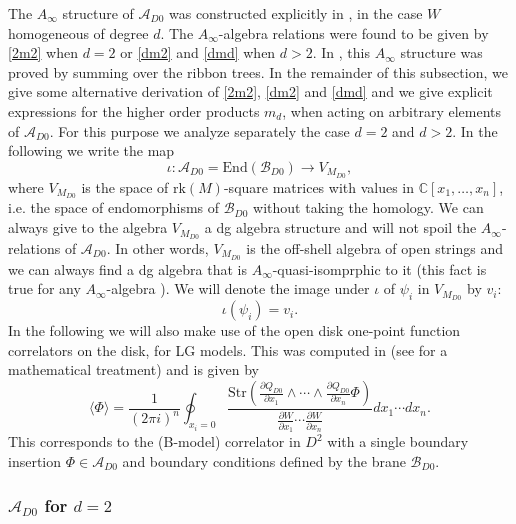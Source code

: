 \documentclass[a4paper,11pt]{article}
\newcommand{\Af}{{A_\infty}}
\numberwithin{equation}{section}
\begin{document}
The $\Af$ structure of $\mathcal{A}_{D0}$ was constructed explicitly in 
\cite{ballard2014derived}, in the case $W$ homogeneous of degree $d$. The  
$\Af$-algebra relations were found to be given by 
\eqref{2m2} when $d=2$ or \eqref{dm2} and \eqref{dmd} when $d>2$. In 
\cite{ballard2014derived}, this $\Af$ 
structure was proved by summing over the ribbon trees. In the remainder 
of this subsection, we give some alternative derivation of \eqref{2m2}, 
\eqref{dm2} and \eqref{dmd} and we give explicit expressions for the higher 
order
products $m_{d}$, when acting on arbitrary elements of $\mathcal{A}_{D0}$. For 
this purpose we analyze separately the case $d=2$ and $d>2$. In the following 
we write the map 
\begin{equation}
\iota: \mathcal{A}_{D0}=\mathrm{End}(\mathcal{B}_{D0})\rightarrow V_{M_{D0}},
\end{equation}
where $V_{M_{D0}}$ is the space of $\mathrm{rk}(M)$-square matrices with 
values in $\mathbb{C}[x_{1},\ldots,x_{n}]$, i.e. the space of endomorphisms of 
$\mathcal{B}_{D0}$ without taking the homology. We can always give to the 
algebra $V_{M_{D0}}$ a dg algebra structure and will not spoil the 
$A_{\infty}$-relations of $\mathcal{A}_{D0}$. In other words, $V_{M_{D0}}$ is 
the off-shell algebra of open strings and we can always find a dg algebra that 
is $A_{\infty}$-quasi-isomprphic to it (this fact is true for any 
$A_{\infty}$-algebra \cite{lefevre2003infini}). We will denote the image under 
$\iota$ of $\psi_{i}$ in $V_{M_{D0}}$ by $v_{i}$:
\begin{equation}
\iota(\psi_i) = v_i.
\end{equation}
In the following we will also make use of the open disk one-point function 
correlators on the disk, for LG models. This was computed in 
\cite{Kapustin:2003ga} (see \cite{dyckerhoff2012kapustin,Carqueville:2012st} 
for a mathematical treatment) and is given by
\begin{equation}\label{res}
\langle \Phi \rangle = \frac{1}{(2 \pi i)^n} 
\oint_{x_i=0} \frac{\mathrm{Str}\left( \frac{\partial Q_{D0}}{\partial x_1} 
\wedge \cdots \wedge \frac{\partial Q_{D0}}{\partial 
x_n}\Phi\right)}{\frac{\partial W}{\partial x_1} \cdots \frac{\partial 
W}{\partial x_n}} dx_1\cdots dx_n.
\end{equation}
This corresponds to the (B-model) correlator in $D^{2}$ with a single boundary 
insertion $\Phi\in \mathcal{A}_{D0}$ and boundary conditions defined by the 
brane $\mathcal{B}_{D0}$.

\subsubsection{$\mathcal{A}_{D0}$ for $d=2$}
\end{document}
